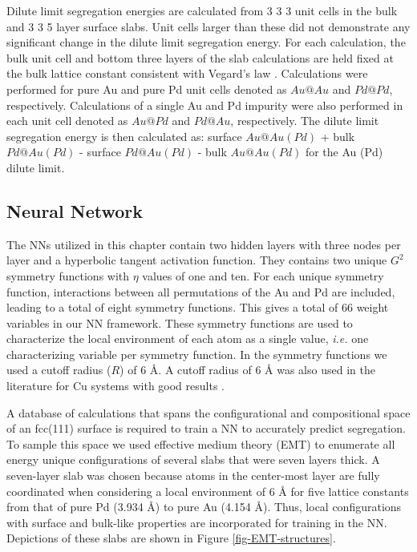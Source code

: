 \documentclass[12pt]{cmuthesis}
\begin{document}
Dilute limit segregation energies are calculated from 3 \texttimes{} 3 \texttimes{} 3 unit cells in the bulk and 3 \texttimes{} 3 \texttimes{} 5 layer surface slabs. Unit cells larger than these did not demonstrate any significant change in the dilute limit segregation energy. For each calculation, the bulk unit cell and bottom three layers of the slab calculations are held fixed at the bulk lattice constant consistent with Vegard's law \cite{denton-1991-vegar-law}. Calculations were performed for pure Au and pure Pd unit cells denoted as \(Au@Au\) and \(Pd@Pd\), respectively. Calculations of a single Au and Pd impurity were also performed in each unit cell denoted as \(Au@Pd\) and \(Pd@Au\), respectively. The dilute limit segregation energy is then calculated as: surface \(Au@Au(Pd)\) + bulk \(Pd@Au(Pd)\) - surface \(Pd@Au(Pd)\) - bulk \(Au@Au(Pd)\) for the Au (Pd) dilute limit.

\subsection{Neural Network}
\label{sec:orge3d0222}
The NNs utilized in this chapter contain two hidden layers with three nodes per layer and a hyperbolic tangent activation function. They contains two unique \(G^{2}\) symmetry functions with \(\eta\) values of one and ten. For each unique symmetry function, interactions between all permutations of the Au and Pd are included, leading to a total of eight symmetry functions. This gives a total of 66 weight variables in our NN framework. These symmetry functions are used to characterize the local environment of each atom as a single value, \emph{i.e.} one characterizing variable per symmetry function. In the symmetry functions we used a cutoff radius (\(R\)) of 6 \AA{}. A cutoff radius of 6 \AA{} was also used in the literature for Cu systems with good results \cite{artrith-2012-high}.

A database of calculations that spans the configurational and compositional space of an fcc(111) surface is required to train a NN to accurately predict segregation. To sample this space we used effective medium theory (EMT) \cite{jacobsen-1996-semi-empir} to enumerate all energy unique configurations of several slabs that were seven layers thick. A seven-layer slab was chosen because atoms in the center-most layer are fully coordinated when considering a local environment of 6 \AA{} for five lattice constants from that of pure Pd (3.934 \AA{}) to pure Au (4.154 \AA{}). Thus, local configurations with surface and bulk-like properties are incorporated for training in the NN. Depictions of these slabs are shown in Figure \ref{fig-EMT-structures}.
\end{document}
